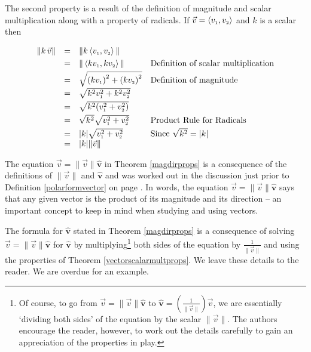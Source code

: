 \documentclass{ximera}
\begin{document}
\smallskip

The second property is a result of the definition of magnitude and scalar multiplication along with a property of radicals. If $\vec{v} = \left< v_{\mbox{\tiny $1$}} ,v_{\mbox{\tiny $2$}}\right>$ and $k$ is a scalar then 

\[ \begin{array}{rcll}

\| k \, \vec{v} \| & = & \| k \left< v_{\mbox{\tiny $1$}}, v_{\mbox{\tiny $2$}}\right> \| & \\ [3pt]
									 & = & \| \left<kv_{\mbox{\tiny $1$}},kv_{\mbox{\tiny $2$}}\right>\| & \text{Definition of scalar multiplication} \\ [3pt]
									 & = & \sqrt{\left(kv_{\mbox{\tiny $1$}}\right)^2 + \left(kv_{\mbox{\tiny $2$}}\right)^2} & \text{Definition of magnitude} \\ [3pt]
									 & = & \sqrt{k^2v_{\mbox{\tiny $1$}}^2 + k^2v_{\mbox{\tiny $2$}}^2} & \\[3pt]
									 & = & \sqrt{k^2(v_{\mbox{\tiny $1$}}^2+v_{\mbox{\tiny $2$}}^2)} & \\ [3pt]
									 & = & \sqrt{k^2} \sqrt{v_{\mbox{\tiny $1$}}^2+v_{\mbox{\tiny $2$}}^2} & \text{Product Rule for Radicals} \\ [3pt]
									 & = & |k| \sqrt{v_{\mbox{\tiny $1$}}^2+v_{\mbox{\tiny $2$}}^2} & \text{Since $\sqrt{k^2} = |k|$} \\
									 & = & |k| \| \vec{v} \| & \\
\end{array} \]

\smallskip

The equation $\vec{v} = \| \vec{v} \| \bm\hat{v}$ in Theorem \ref{magdirprops} is a consequence of the definitions of $\| \vec{v} \|$ and $\bm\hat{v}$ and was worked out in the discussion just prior to Definition \ref{polarformvector} on page \pageref{polarformvectorsection}.  In words, the equation $\vec{v} = \| \vec{v} \| \bm\hat{v}$  says that any given vector is the product of its magnitude and its direction -- an important concept to keep in mind when studying and using vectors. 

\smallskip

The formula for   $\bm\hat{v}$ stated  in Theorem \ref{magdirprops}  is a consequence of solving $\vec{v} = \| \vec{v} \| \bm\hat{v}$  for $\bm\hat{v}$ by multiplying\footnote{Of course, to go from $\vec{v} = \| \vec{v} \| \bm\hat{v}$ to $\bm\hat{v} = \left( \frac{1}{\|\vec{v}\|}\right) \vec{v}$, we are essentially `dividing both sides' of the equation by the scalar $\| \vec{v} \|$.  The authors encourage the reader, however, to work out the details carefully to gain an appreciation of the properties in play.} both sides of the equation by $\frac{1}{\| \vec{v} \|}$ and using the properties of Theorem \ref{vectorscalarmultprops}.  We leave these details to the reader. We are overdue for an example.
\end{document}
